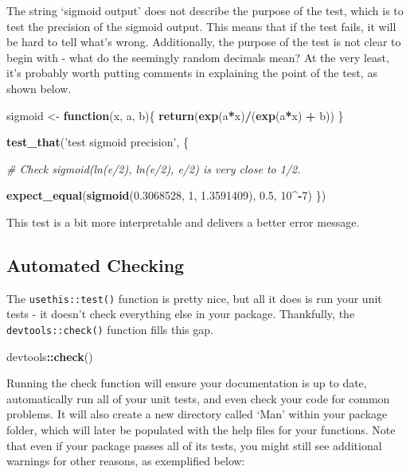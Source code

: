 \documentclass[]{book}
\newenvironment{Shaded}{\begin{snugshade}}{\end{snugshade}}
\newcommand{\KeywordTok}[1]{\textcolor[rgb]{0.13,0.29,0.53}{\textbf{#1}}}
\newcommand{\DecValTok}[1]{\textcolor[rgb]{0.00,0.00,0.81}{#1}}
\newcommand{\FloatTok}[1]{\textcolor[rgb]{0.00,0.00,0.81}{#1}}
\newcommand{\StringTok}[1]{\textcolor[rgb]{0.31,0.60,0.02}{#1}}
\newcommand{\CommentTok}[1]{\textcolor[rgb]{0.56,0.35,0.01}{\textit{#1}}}
\newcommand{\ControlFlowTok}[1]{\textcolor[rgb]{0.13,0.29,0.53}{\textbf{#1}}}
\newcommand{\OperatorTok}[1]{\textcolor[rgb]{0.81,0.36,0.00}{\textbf{#1}}}
\newcommand{\NormalTok}[1]{#1}
\begin{document}
The string `sigmoid output' does not describe the purpose of the test,
which is to test the precision of the sigmoid output. This means that if
the test fails, it will be hard to tell what's wrong. Additionally, the
purpose of the test is not clear to begin with - what do the seemingly
random decimals mean? At the very least, it's probably worth putting
comments in explaining the point of the test, as shown below.

\begin{Shaded}
\begin{Highlighting}[]
\NormalTok{sigmoid <-}\StringTok{ }\ControlFlowTok{function}\NormalTok{(x, a, b)\{}
  \KeywordTok{return}\NormalTok{(}\KeywordTok{exp}\NormalTok{(a}\OperatorTok{*}\NormalTok{x)}\OperatorTok{/}\NormalTok{(}\KeywordTok{exp}\NormalTok{(a}\OperatorTok{*}\NormalTok{x) }\OperatorTok{+}\StringTok{ }\NormalTok{b))}
\NormalTok{\}}

\KeywordTok{test_that}\NormalTok{(}\StringTok{'test sigmoid precision'}\NormalTok{, \{}

  \CommentTok{# Check sigmoid(ln(e/2), ln(e/2), e/2) is very close to 1/2.}

  \KeywordTok{expect_equal}\NormalTok{(}\KeywordTok{sigmoid}\NormalTok{(}\FloatTok{0.3068528}\NormalTok{, }\DecValTok{1}\NormalTok{, }\FloatTok{1.3591409}\NormalTok{), }\FloatTok{0.5}\NormalTok{, }\DecValTok{10}\OperatorTok{^-}\DecValTok{7}\NormalTok{)}
\NormalTok{\})}
\end{Highlighting}
\end{Shaded}

This test is a bit more interpretable and delivers a better error
message.

\subsection{Automated Checking}\label{automated-checking}

The \texttt{usethis::test()} function is pretty nice, but all it does is
run your unit tests - it doesn't check everything else in your package.
Thankfully, the \texttt{devtools::check()} function fills this gap.

\begin{Shaded}
\begin{Highlighting}[]
\NormalTok{devtools}\OperatorTok{::}\KeywordTok{check}\NormalTok{()}
\end{Highlighting}
\end{Shaded}

Running the check function will ensure your documentation is up to date,
automatically run all of your unit tests, and even check your code for
common problems. It will also create a new directory called `Man' within
your package folder, which will later be populated with the help files
for your functions. Note that even if your package passes all of its
tests, you might still see additional warnings for other reasons, as
exemplified below:
\end{document}
